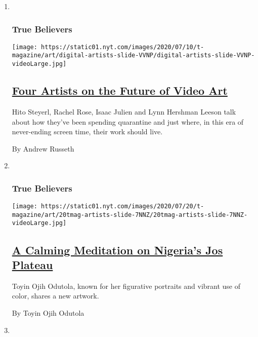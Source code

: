 \begin{enumerate}
\def\labelenumi{\arabic{enumi}.}
\item ~
  \hypertarget{true-believers-7}{%
  \subsubsection{True Believers}\label{true-believers-7}}

  \texttt{[image: https://static01.nyt.com/images/2020/07/10/t-magazine/art/digital-artists-slide-VVNP/digital-artists-slide-VVNP-videoLarge.jpg]}

  \hypertarget{four-artists-on-the-future-of-video-art}{%
  \subsection{\texorpdfstring{\href{/2020/07/22/t-magazine/video-art.html}{Four
  Artists on the Future of Video
  Art}}{Four Artists on the Future of Video Art}}\label{four-artists-on-the-future-of-video-art}}

  Hito Steyerl, Rachel Rose, Isaac Julien and Lynn Hershman Leeson talk
  about how they've been spending quarantine and just where, in this era
  of never-ending screen time, their work should live.

  By Andrew Russeth
\item ~
  \hypertarget{true-believers-8}{%
  \subsubsection{True Believers}\label{true-believers-8}}

  \texttt{[image: https://static01.nyt.com/images/2020/07/20/t-magazine/art/20tmag-artists-slide-7NNZ/20tmag-artists-slide-7NNZ-videoLarge.jpg]}

  \hypertarget{a-calming-meditation-on-nigerias-jos-plateau}{%
  \subsection{\texorpdfstring{\href{/2020/07/22/t-magazine/toyin-ojih-odutola.html}{A
  Calming Meditation on Nigeria's Jos
  Plateau}}{A Calming Meditation on Nigeria's Jos Plateau}}\label{a-calming-meditation-on-nigerias-jos-plateau}}

  Toyin Ojih Odutola, known for her figurative portraits and vibrant use
  of color, shares a new artwork.

  By Toyin Ojih Odutola
\item ~
  \hypertarget{true-believers-9}{%
}
\end{enumerate}
